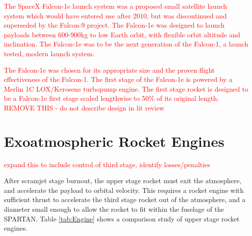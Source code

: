 \textcolor{red}{The SpaceX Falcon-1e launch system was a proposed small satellite launch system which would have entered use after 2010\cite{Vehicle2008}, but was discontinued and superseded by the Falcon-9 project. The Falcon-1e was designed to launch payloads between 600-900kg to low Earth orbit, with flexible orbit altitude and inclination. The Falcon-1e was to be the next generation of the Falcon-1\cite{Vehicle2008}, a launch tested, modern launch system. }

\textcolor{red}{The Falcon-1e was chosen for its appropriate size and the proven flight effectiveness of the Falcon-1. The first stage of the Falcon-1e is powered by a Merlin 1C LOX/Kerosene turbopump engine. The first stage rocket is designed to be a Falcon-1e first stage scaled lengthwise to 50\% of its original length. REMOVE THIS -  do not describe design in lit review}


\section{Exoatmospheric Rocket Engines}

\textcolor{red}{expand this to include control of third stage, identify losses/penalties}

After scramjet stage burnout, the upper stage rocket must exit the atmosphere, and accelerate the payload to orbital velocity. This requires a rocket engine with sufficient thrust to accelerate the third stage rocket out of the atmosphere, and a diameter small enough to allow the rocket to fit within the fuselage of the SPARTAN. Table \ref{tab:Engine} shows a comparison study of upper stage rocket engines. 

